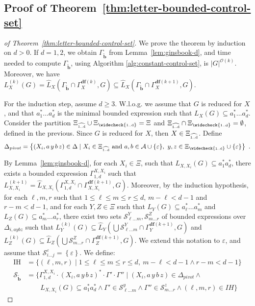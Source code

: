 \documentclass[final]{llncs}
\def\set#1{{\left\{ #1 \right\}}}
\def\len#1{{\vert{#1}\vert}}
\def\prod{\Delta}
\def\patt{{\widetilde{\mathbf{b}}}}
\def\pattg{{\Gamma_\patt}}
\def\df#1{\scriptscriptstyle\mathbf{df}(#1)}
\def\Vars{\ensuremath{\Xi}}
\def\Varsi{\ensuremath{\Xi_{\widecheck{\text{\tiny 1..d}}}}}
\def\Varse{\ensuremath{\Xi_{\widehat{\text{\tiny 1..d}}}}}
\begin{document}
\subsection{Proof of Theorem~\ref{thm:letter-bounded-control-set}}
\begin{proof}[of Theorem~\ref{thm:letter-bounded-control-set}]
We prove the theorem by induction on $d > 0$. If $d=1,2$, we obtain
$\pattg$ from Lemma~\ref{lem:ginsbook-d}, and time needed to compute
$\pattg$, using Algorithm \ref{alg:constant-control-set}, is
$\len{G}^{\mathcal{O}(k)}$. Moreover, we have $L_X^{(k)}(G) =
\hat{L}_X(\pattg \cap \Gamma_{X}^{\df{k}}, G) \subseteq
\hat{L}_X(\pattg \cap \Gamma_{X}^{\df{k+1}}, G)$.

For the induction step, assume $d \geq 3$. W.l.o.g. we assume that $G$
is reduced for $X$, and that $a_1^* \ldots a_d^*$ is the minimal
bounded expression such that $L_X(G) \subseteq a_1^* \ldots
a_d^*$. Consider the partition $\Varse \cup \Varsi = \Vars$ and
$\Varse \cap \Varsi = \emptyset$, defined in the previous. Since $G$
is reduced for $X$, then $X \in \Varse$. Define 
\[\prod_{\mathit{pivot}} =
\set{(X_i,a\, y\, b\, z)\in\prod \mid X_i \in \Varse ~\mbox{and}~a,b \in \mathcal{A}\cup\set{\varepsilon},\ y,z \in \Varsi \cup \set{\varepsilon}}\enspace .\]

By Lemma~\ref{lem:ginsbook-d}, for each $X_i \in \Vars$, such that
$L_{X,X_i}(G) \subseteq a_1^*a_d^*$, there exists a bounded expression
$\Gamma_{1,d}^{X,X_i}$ such that
$L_{X,X_i}^{(k+1)} = \hat{L}_{X,X_i}(\Gamma_{1,d}^{X,X_i} \cap \Gamma_{X,X_i}^{\df{k+1}},
G)$. Moreover, by the induction hypothesis, for each $\ell, m, r$ such
that $1 \leq \ell \leq m \leq r \leq d$, $m - \ell < d - 1$ and $r - m
< d - 1$, and for each $Y,Z \in \Vars$ such that $L_Y(G) \subseteq
a_\ell^* \ldots a_m^*$ and $L_Z(G) \subseteq a_m^* \ldots a_r^*$,
there exist two sets $\mathcal{S}^Y_{\ell \ldots m}, \mathcal{S}^Z_{m
\ldots r}$ of bounded expressions over \(\Delta_{i,aybz}\) such that
$L_Y^{(k)}(G) \subseteq
\hat{L}_Y(\bigcup\mathcal{S}^Y_{\ell \ldots m} \cap \Gamma_{Y}^{\df{k+1}}, G)$ and
$L_Z^{(k)}(G) \subseteq \hat{L}_Z(\bigcup\mathcal{S}^Z_{m \ldots r} \cap
\Gamma_{Z}^{\df{k+1}}, G)$. We extend this notation to \(\varepsilon\), and assume that 
\(\mathcal{S}^{\varepsilon}_{i \ldots j} = \set{\varepsilon}\). We define: 
\begin{align*}
\mbox{IH} & = \{(\ell,m,r) \mid 1 \leq \ell \leq m \leq r \leq d,~m - \ell < d - 1 \land r - m < d - 1\} \\
\mathcal{S}_\patt & = \{ \Gamma_{1,d}^{X,X_i} \cdot (X_i,a\, y\, b\, z)^* \cdot \Gamma' \cdot \Gamma'' 
\mid (X_i,a\, y\, b\, z) \in \prod_{\mathit{pivot}} \land \\
&\quad\quad L_{X,X_i}(G) \subseteq a_1^* a_d^* \land \Gamma'\in\mathcal{S}^y_{\ell \ldots m} \land \Gamma''\in\mathcal{S}^z_{m \ldots r} \land (\ell,m,r) \in IH\}
\end{align*}



\end{proof}
\end{document}

